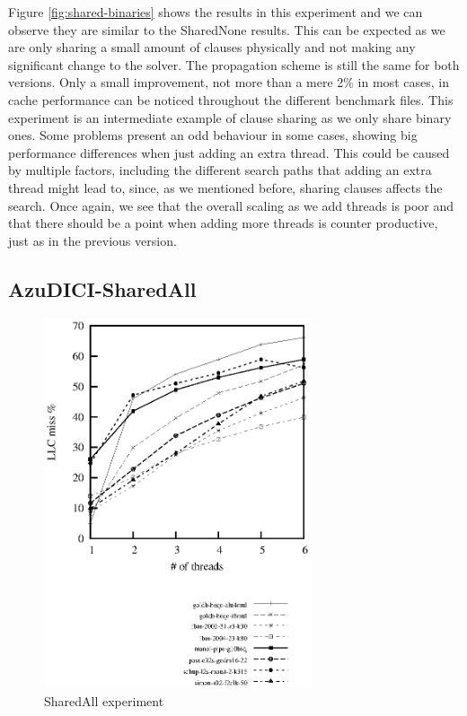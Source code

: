 \documentclass[12pt]{diicc}
\begin{document}
Figure \ref{fig:shared-binaries} shows the results in this experiment and we can observe they are similar to the SharedNone results. This can be expected as we are only sharing a small amount of clauses physically and not making any significant change to the solver. The propagation scheme is still the same for both versions. Only a small improvement, not more than a mere 2\% in most cases, in cache performance can be noticed throughout the different benchmark files. This experiment is an intermediate example of clause sharing as we only share binary ones. Some problems present an odd behaviour in some cases, showing big performance differences when just adding an extra thread. This could be caused by multiple factors, including the different search paths that adding an extra thread might lead to, since, as we mentioned before, sharing clauses affects the search. Once again, we see that the overall scaling as we add threads is poor and that there should be a point when adding more threads is counter productive, just as in the previous version.

\subsection{AzuDICI-SharedAll}

\begin{figure}[h!]
	\centering
		\includegraphics[width=0.7\textwidth]{shared-all}
	\caption{SharedAll experiment}
	\label{fig:shared-all}
\end{figure}
\end{document}

